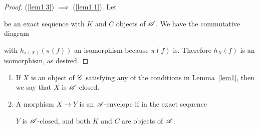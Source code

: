 \documentclass[dissertation.tex]{subfiles}
\begin{document}
\begin{lem}
\begin{proof}
    (\ref{lem1.3}) $\implies$ (\ref{lem1.1}).  Let
    \begin{center}
    \end{center}
    be an exact sequence with $K$ and $C$ objects of $\mathscr{A}$.
    We have the commutative diagram
    \begin{center}
    \end{center}
    with $h_{\pi(X)}(\pi(f))$ an isomorphism because $\pi(f)$ is.
    Therefore $h_X(f)$ is an isomorphism, as desired.
  \end{proof}
\end{lem}

\begin{defn}
  \begin{enumerate}
  \item
    If $X$ is an object of $\mathscr{C}$ satisfying any of the conditions in Lemma~\ref{lem1}, then we say that $X$ is $\mathscr{A}$-closed.
  \item
    A morphism $X \rightarrow Y$ is an $\mathscr{A}$-envelope if in the exact sequence
    \begin{center}
    \end{center}
    $Y$ is $\mathscr{A}$-closed, and both $K$ and $C$ are objects of $\mathscr{A}$.
  \end{enumerate}
\end{defn}
\end{document}
